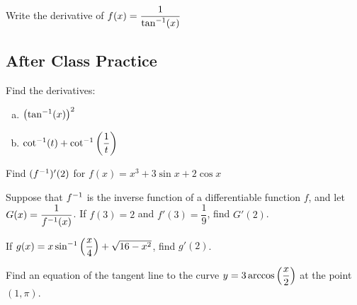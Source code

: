 \documentclass[notes]{subfiles}
\begin{document}
		\begin{ex}
			Write the derivative of \(f(x) = \dfrac{1}{\tan^{-1}(x)}\)
		\end{ex}
			\newpage
	
	\subsection*{After Class Practice}
		\begin{ex}
			Find the derivatives:
			\begin{enumerate}[(a)]
				\item \(\left( \tan^{-1}(x)\right)^2\)
					
				\item \(\cot^{-1}(t) + \cot^{-1}\left( \dfrac{1}{t}\right)\)
			\end{enumerate}
		\end{ex}	

		\begin{ex}
			Find \((f^{-1})'(2)\) for \(f(x) = x^3 + 3\sin x + 2\cos x\)
		\end{ex}
			\vs{1}
			\newpage
			
		\begin{ex}
			Suppose that \(f^{-1}\) is the inverse function of a differentiable function \(f\), and let \(G(x) = \dfrac{1}{f^{-1}(x)}\). If \(f(3) = 2\) and \(f'(3) = \dfrac{1}{9}\), find \(G'(2)\).
		\end{ex}
			
		\begin{ex}
			If \(g(x) = x\sin^{-1}\left( \dfrac{x}{4}\right) +\sqrt{16-x^2}\), find \(g'(2)\).
		\end{ex}
			\vs{1.5}
			
		\begin{ex}
			Find an equation of the tangent line to the curve \(y = 3\arccos\left( \dfrac{x}{2}\right)\) at the point \((1,\pi)\).
		\end{ex}
			\vs{1}
			\newpage
			
	
\clearpage
\end{document}
